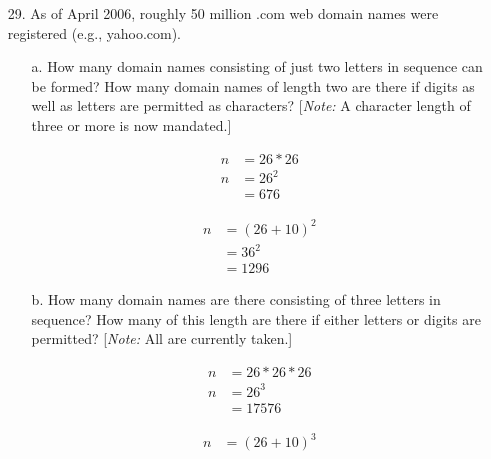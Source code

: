 \documentclass[letterpaper,12pt]{article}
\begin{document}
\maketitle

\begin{enumerate}
  \item[29.]
    As of April 2006, roughly 50 million .com web domain names were registered (e.g., yahoo.com).
    \begin{enumerate}
      \item[a.]
        How many domain names consisting of just two letters in sequence can be formed? How many domain names of length two are there if digits as well as letters are permitted as characters? [\textit{Note:} A character length of three or more is now mandated.] \\
        \begin{minipage}{.5\linewidth}
          \begin{align*}
            n &= 26 * 26 \\
            n &= 26^2 \\
            &= 676
          \end{align*}
        \end{minipage}%
        \begin{minipage}{.5\linewidth}
          \begin{align*}
            n &= (26 + 10)^2 \\
            &= 36^2 \\
            &= 1296
          \end{align*}
        \end{minipage}
      \item[b.]
        How many domain names are there consisting of three letters in sequence? How many of this length are there if either letters or digits are permitted? [\textit{Note:} All are currently taken.] \\
        \begin{minipage}{.5\linewidth}
          \begin{align*}
            n &= 26 * 26 * 26 \\
            n &= 26^3 \\
            &= 17576
          \end{align*}
        \end{minipage}%
        \begin{minipage}{.5\linewidth}
          \begin{align*}
            n &= (26 + 10)^3 \\

\end{align*}
\end{minipage}
\end{enumerate}
\end{enumerate}
\end{document}
